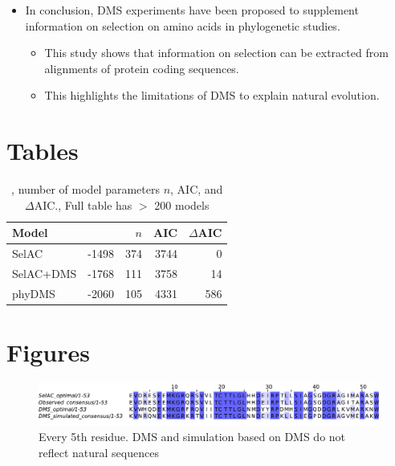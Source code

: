\documentclass[12pt]{article}
\begin{document}
\begin{itemize}
	\item In conclusion, DMS experiments have been proposed to supplement information on selection on amino acids in phylogenetic studies.
	\begin{itemize}
		\item This study shows that information on selection can be extracted from alignments of protein coding sequences.
		\item This highlights the limitations of DMS to explain natural evolution.
	\end{itemize}
\end{itemize}


\section*{Tables}


\begin{table}
  \centering
  \begin{tabular}{lrrrr}
    Model	& \LLik &$n$ & AIC & $\Delta$AIC\\ \hline 
    SelAC	& -1498 & 374& 3744&  0\\
    SelAC+DMS 	& -1768 & 111& 3758& 14\\
    phyDMS 	& -2060 & 105& 4331& 586\\

  \end{tabular}
  \caption{\LLik, number of model parameters $n$, AIC, and $\Delta$AIC., Full table has $>$ 200 models}
  \label{tab:AIC}
\end{table}


\section*{Figures}


\begin{figure}[H]
     \centering
	\includegraphics[width=\textwidth]{img/seq_simil_short.pdf}
	\caption{Every 5th residue. DMS and simulation based on DMS do not reflect natural sequences}
	\label{fig:sim_seqs_cons}
\end{figure}
\end{document}

